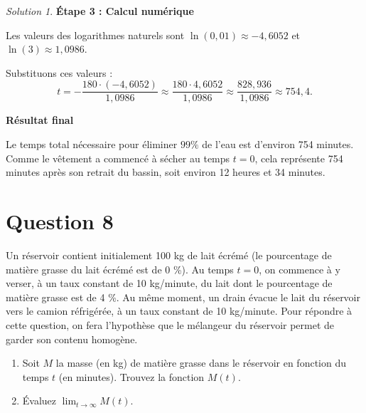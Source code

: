\documentclass[
  12pt,
  letterpaper,
]{book}
\providecommand{\tightlist}{%
  \setlength{\itemsep}{0pt}\setlength{\parskip}{0pt}}\usepackage{longtable,booktabs,array}
\theoremstyle{remark}
\newtheorem*{solution}{Solution}
\begin{document}
\begin{solution}
\textbf{Étape 3 : Calcul numérique}

Les valeurs des logarithmes naturels sont
\(\ln(0{,}01) \approx -4{,}6052\) et \(\ln(3) \approx 1{,}0986\).

Substituons ces valeurs : \[
t = -\frac{180 \cdot (-4{,}6052)}{1{,}0986} \approx \frac{180 \cdot 4{,}6052}{1{,}0986} \approx \frac{828{,}936}{1{,}0986} \approx 754{,}4.
\]

\textbf{Résultat final}

Le temps total nécessaire pour éliminer \(99\%\) de l'eau est d'environ
754 minutes. Comme le vêtement a commencé à sécher au temps \(t=0\),
cela représente 754 minutes après son retrait du bassin, soit environ 12
heures et 34 minutes.

\end{solution}

\hypertarget{question-8-2}{%
\section{Question 8}\label{question-8-2}}

Un réservoir contient initialement 100 kg de lait écrémé (le pourcentage
de matière grasse du lait écrémé est de 0 \%). Au temps \(t=0\), on
commence à y verser, à un taux constant de 10 kg/minute, du lait dont le
pourcentage de matière grasse est de 4 \%. Au même moment, un drain
évacue le lait du réservoir vers le camion réfrigérée, à un taux
constant de 10 kg/minute. Pour répondre à cette question, on fera
l'hypothèse que le mélangeur du réservoir permet de garder son contenu
homogène.

\begin{enumerate}
\def\labelenumi{\arabic{enumi}.}
\tightlist
\item
  Soit \(M\) la masse (en kg) de matière grasse dans le réservoir en
  fonction du temps \(t\) (en minutes). Trouvez la fonction \(M(t)\).
\item
  Évaluez \(\lim_{t\rightarrow\infty}M(t)\).
\end{enumerate}
\end{document}
